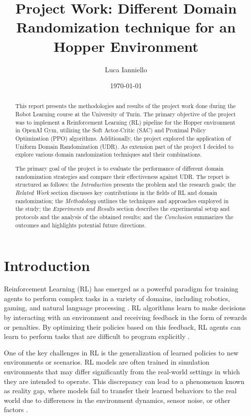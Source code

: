 \documentclass[12pt]{article}
\title{Project Work: Different Domain Randomization technique for an Hopper Environment}
\author{Luca Ianniello}
\date{\today}
\begin{document}
\maketitle

\begin{abstract}

    This report presents the methodologies and results of the project work done during the Robot Learning course at the University of Turin. The primary objective of the project was to implement a Reinforcement Learning (RL) pipeline for the Hopper environment in OpenAI Gym, utilizing the Soft Actor-Critic (SAC) and Proximal Policy Optimization (PPO) algorithms. Additionally, the project explored the application of Uniform Domain Randomization (UDR). As extension part of the project I decided to explore various domain randomization techniques and their combinations.

    The primary goal of the project is to evaluate the performance of different domain randomization strategies and compare their effectiveness against UDR. The report is structured as follows: the \textit{Introduction} presents the problem and the research goals; the \textit{Related Work} section discusses key contributions in the fields of RL and domain randomization; the \textit{Methodology} outlines the techniques and approaches employed in the study; the \textit{Experiments and Results} section describes the experimental setup and protocols and the analysis of the obtained results; and the \textit{Conclusion} summarizes the outcomes and highlights potential future directions.
    
\end{abstract}

\section{Introduction}

Reinforcement Learning (RL) has emerged as a powerful paradigm for training agents to perform complex tasks in a variety of domains, including robotics, gaming, and natural language processing \cite{Sutton2018}. RL algorithms learn to make decisions by interacting with an environment and receiving feedback in the form of rewards or penalties. By optimizing their policies based on this feedback, RL agents can learn to perform tasks that are difficult to program explicitly \cite{Kober2013}. 

One of the key challenges in RL is the generalization of learned policies to new environments or scenarios. RL models are often trained in simulation environments that may differ significantly from the real-world settings in which they are intended to operate. This discrepancy can lead to a phenomenon known as reality gap, where models fail to transfer their learned behaviors to the real world due to differences in the environment dynamics, sensor noise, or other factors \cite{Kormushev2013, Hofer2020}.
\end{document}
